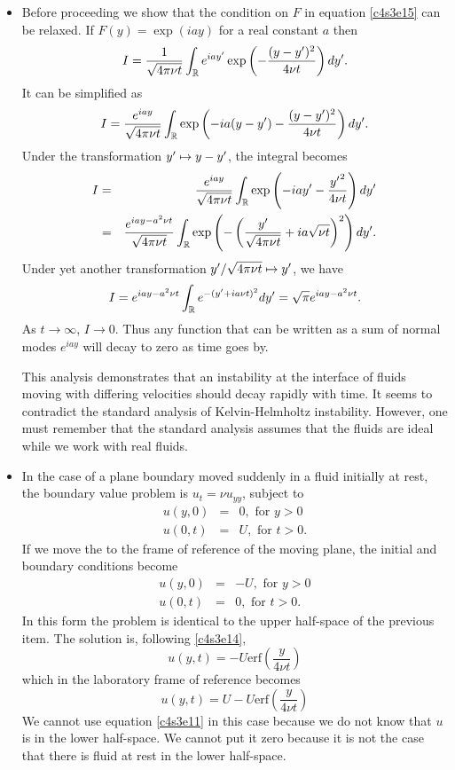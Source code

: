 \begin{itemize}
\item Before proceeding we show that the condition on $F$ in equation \eqref{c4s3e15} can be
relaxed. If $F(y) = \exp(iay)$ for a real constant $a$ then 
\[
I = \frac{1}{\sqrt{4\pi\nu t}}\int_{\mathbb{R}}e^{iay^\prime}\exp\left(-\frac{(y - y^\prime)^2}{4\nu t}\right)dy^\prime.
\]
It can be simplified as
\[
I = \frac{e^{iay}}{\sqrt{4\pi\nu t}}\int_{\mathbb{R}}\exp\left(-ia(y - y^\prime) - \frac{(y - y^\prime)^2}{4\nu t}\right)dy^\prime.
\]
Under the transformation $y^\prime \mapsto y - y^\prime$, the integral becomes
\begin{eqnarray*}
I &=& \frac{e^{iay}}{\sqrt{4\pi\nu t}}\int_{\mathbb{R}}\exp\left(-iay^\prime - \frac{{y^\prime}^2}{4\nu t}\right)dy^\prime \\
 &=& \frac{e^{iay - a^2\nu t}}{\sqrt{4\pi\nu t}}\int_{\mathbb{R}}\exp\left(-\left(\frac{y^\prime}{\sqrt{4\pi\nu t}} + ia\sqrt{\nu t}\right)^2\right) dy^\prime.
\end{eqnarray*}
Under yet another transformation $y^\prime/\sqrt{4\pi\nu t} \mapsto y^\prime$, we have
\[
I = e^{iay - a^2\nu t}\int_{\mathbb{R}}e^{-({y^\prime} + ia\nu t)^2}dy^\prime = \sqrt{\pi}e^{iay - a^2\nu t}.
\]
As $t \rightarrow \infty$, $I \rightarrow 0$. Thus any function that can be written as a sum of normal modes $e^{iay}$ 
will decay to zero as time goes by.

This analysis demonstrates that an instability at the interface of fluids moving with differing velocities
should decay rapidly with time. It seems to contradict the standard analysis of Kelvin-Helmholtz instability.
However, one must remember that the standard analysis assumes that the fluids are ideal while we work
with real fluids.

\item In the case of a plane boundary moved suddenly in a fluid initially at rest, the boundary value
problem is $u_t = \nu u_{yy}$, subject to
\begin{eqnarray*}
u(y, 0) &=& 0, \text{ for } y > 0 \\
u(0, t) &=& U, \text{ for } t > 0.
\end{eqnarray*}
If we move the to the frame of reference of the moving plane, the initial and boundary conditions become
\begin{eqnarray*}
u(y, 0) &=& -U, \text{ for } y > 0 \\
u(0, t) &=& 0, \text{ for } t > 0.
\end{eqnarray*}
In this form the problem is identical to the upper half-space of the previous item. The solution is, following
\eqref{c4s3e14},
\begin{equation}
u(y, t) = -U\text{erf}\left(\frac{y}{4\nu t}\right)
\end{equation}\label{c4s3e17}
which in the laboratory frame of reference becomes
\begin{equation}\label{c4s3e18}
u(y, t) = U - U\text{erf}\left(\frac{y}{4\nu t}\right)
\end{equation}
We cannot use equation \eqref{c4s3e11} in this case because we do not know that $u$ is in the lower half-space.
We cannot put it zero because it is not the case that there is fluid at rest in the lower half-space.


\end{itemize}
